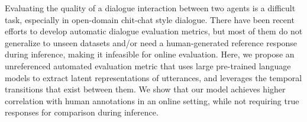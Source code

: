 Evaluating the quality of a dialogue interaction between two agents is a difficult task, especially in open-domain chit-chat style dialogue.  There have been recent efforts to develop automatic dialogue evaluation metrics, but most of them do not generalize to unseen datasets and/or need a human-generated reference response during inference, making it infeasible for online evaluation. Here, we propose an unreferenced automated evaluation metric that uses large pre-trained language models to extract latent representations of utterances, and leverages the temporal transitions that exist between them. We show that our model achieves higher correlation with human annotations in an online setting, while not requiring true responses for comparison during inference.
